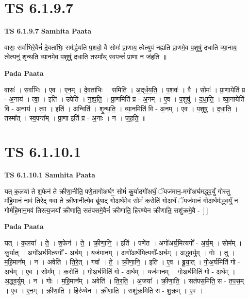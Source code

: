 \documentclass[17pt]{extarticle}
\begin{document}

\section{ TS 6.1.9.7 }

\textbf{TS 6.1.9.7 } \newline
\textbf{Samhita Paata} \newline

वासः॒ सर्वा॑भिरे॒वैनं॑ दे॒वता॑भिः॒ सम॑र्द्धयति प॒शवो॒ वै सोमः॑ प्रा॒णाय॒ त्वेत्युप॑ नह्यति प्रा॒णमे॒व प॒शुषु॑ दधाति व्या॒नाय॒ त्वेत्यनु॑ शृन्थति व्या॒नमे॒व प॒शुषु॑ दधाति॒ तस्मा᳚थ् स्व॒पन्तं॑ प्रा॒णा न ज॑हति ॥ \newline

\textbf{Pada Paata} \newline

वासः॑ । सर्वा॑भिः । ए॒व । ए॒न॒म् । दे॒वता॑भिः । समिति॑ । अ॒द्‌र्ध॒य॒ति॒ । प॒शवः॑ । वै । सोमः॑ । प्रा॒णायेति॑ प्र - अ॒नाय॑ । त्वा॒ । इति॑ । उपेति॑ । न॒ह्य॒ति॒ । प्रा॒णमिति॑ प्र - अ॒नम् । ए॒व । प॒शुषु॑ । द॒धा॒ति॒ । व्या॒नायेति॑ वि - अ॒नाय॑ । त्वा॒ । इति॑ । अन्विति॑ । शृ॒न्थ॒ति॒ । व्या॒नमिति॑ वि - अ॒नम् । ए॒व । प॒शुषु॑ । द॒धा॒ति॒ । तस्मा᳚त् । स्व॒पन्त᳚म् । प्रा॒णा इति॑ प्र - अ॒नाः । न । ज॒ह॒ति॒ ॥  \newline





\section{ TS 6.1.10.1 }

\textbf{TS 6.1.10.1 } \newline
\textbf{Samhita Paata} \newline

यत् क॒लया॑ ते श॒फेन॑ ते क्रीणा॒नीति॒ पणे॒तागो॑अर्घꣳ॒॒ सोमं॑ कु॒र्यादगो॑अर्घं॒ ॅयज॑मान॒-मगो॑अर्घमद्ध्व॒र्युं गोस्तु म॑हि॒मानं॒ नाव॑ तिरे॒द् गवा॑ ते क्रीणा॒नीत्ये॒व ब्रू॑याद् गोअ॒र्घमे॒व सोमं॑ क॒रोति॑ गोअ॒र्घं ॅयज॑मानं गोअ॒र्घम॑द्ध्व॒र्युं न गोर्म॑हि॒मान॒मव॑ तिरत्य॒जया᳚ क्रीणाति॒ सत॑पसमे॒वैनं॑ क्रीणाति॒ हिर॑ण्येन क्रीणाति॒ सशु॑क्रमे॒वै - [  ] \newline

\textbf{Pada Paata} \newline

यत् । क॒लया᳚ । ते॒ । श॒फेन॑ । ते॒ । क्री॒णा॒नि॒ । इति॑ । पणे॑त । अगो॑अर्घ॒मित्यगो᳚ - अ॒र्घ॒म् । सोम᳚म् । कु॒र्यात् । अगो॑अर्घ॒मित्यगो᳚ - अ॒र्घ॒म् । यज॑मानम् । अगो॑अर्घ॒मित्यगो᳚-अ॒र्घ॒म् । अ॒द्ध्व॒र्युम् । गोः । तु । म॒हि॒मान᳚म् । न । अवेति॑ । ति॒रे॒त् । गवा᳚ । ते॒ । क्री॒णा॒नि॒ । इति॑ । ए॒व । ब्रू॒या॒त् । गो॒अ॒र्घमिति॑ गो - अ॒र्घम् । ए॒व । सोम᳚म् । क॒रोति॑ । गो॒अ॒र्घमिति॑ गो - अ॒र्घम् । यज॑मानम् । गो॒अ॒र्घमिति॑ गो - अ॒र्घम् । अ॒द्ध्व॒र्युम् । न । गोः । म॒हि॒मान᳚म् । अवेति॑ । ति॒र॒ति॒ । अ॒जया᳚ । क्री॒णा॒ति॒ । सत॑पस॒मिति॒ स - त॒प॒स॒म् । ए॒व । ए॒न॒म् । क्री॒णा॒ति॒ । हिर॑ण्येन । क्री॒णा॒ति॒ । सशु॑क्र॒मिति॒ स - शु॒क्र॒म् । ए॒व ।  \newline
\end{document}
